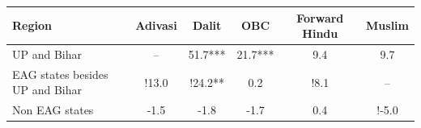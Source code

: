 \begin{tabular}{lccccc}
\hline
Region & Adivasi & Dalit & OBC & Forward Hindu & Muslim \\
\hline
UP and Bihar&--&51.7***&21.7***&9.4&9.7\\
EAG states besides UP and Bihar&!13.0&!24.2**&0.2&!8.1&--\\
Non EAG states&-1.5&-1.8&-1.7&0.4&!-5.0\\
\hline
\end{tabular}
